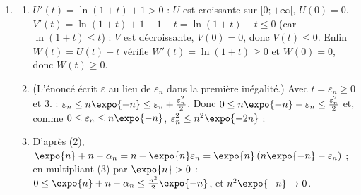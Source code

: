 \begin{description}
\begin{description}
\begin{enumerate}
			\item
			\begin{enumerate}
				\item {}
					$U'(t) = \ln(1 + t) + 1 > 0$ : $U$ est croissante sur $[0;+\infty[$, $U(0) = 0$.
					$V'(t) = \ln(1 + t) + 1 - 1 - t = \ln(1+t) - t \leq 0$ (car $\ln(1+t) \leq t$) : $V$ est décroissante, $V(0) = 0$, donc $V(t) \leq 0$.
					Enfin $W(t) = U(t) - t$ vérifie $W'(t) = \ln(1+t) \geq 0$ et $W(0) = 0$, donc $W(t) \geq 0$.
					\par\noindent{}
				\item {}
					(L'énoncé écrit $\varepsilon$ au lieu de $\varepsilon_n$ dans la première inégalité.)
					Avec $t = \varepsilon_n \geq 0$ et 3. : $\varepsilon_n \leq n\expo{-n} \leq \varepsilon_n + \frac{\varepsilon_n^2}{2}$.
					Donc $0 \leq n\expo{-n} - \varepsilon_n \leq \frac{\varepsilon_n^2}{2}$ et, comme $0 \leq \varepsilon_n \leq n\expo{-n}$, $\varepsilon_n^2 \leq n^2\expo{-2n}$ :
					\par\noindent{}
				\item {}
					D'après (2), $\expo{n} + n - \alpha_n = n - \expo{n}\varepsilon_n = \expo{n}\left(n\expo{-n} - \varepsilon_n\right)$ ; en multipliant (3) par $\expo{n} > 0$ :
					$0 \leq \expo{n} + n - \alpha_n \leq \frac{n^2}{2}\expo{-n}$, et $n^2\expo{-n} \to 0$.
					\par\noindent{}
			\end{enumerate}
		\end{enumerate}
	\end{description}
\end{description}

